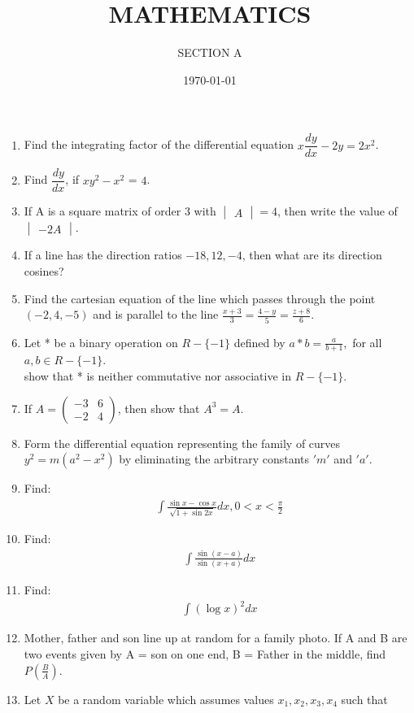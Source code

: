 \documentclass[10pt,-letter paper]{article}
\title{MATHEMATICS}
\author{SECTION A}
\date{\today}
\providecommand{\brak}[1]{\ensuremath{\left(#1\right)}}
\newcommand{\myvec}[1]{\ensuremath{\begin{pmatrix}#1\end{pmatrix}}}
\newcommand{\mydet}[1]{\ensuremath{\begin{vmatrix}#1\end{vmatrix}}}
\begin{document}
\maketitle

\begin{enumerate}
\item Find the integrating factor of the differential equation ${x}\dfrac{dy}{dx}-2{y}=2{x}^2$.
\item Find $\dfrac{dy}{dx}$, if ${x}{y}^2-{x}^2$ = $4$.
\item If A is a square matrix of order $3$ with $\mydet{A} = 4$, then write the value of $\mydet{-2A}$.
\item If a line has the direction ratios ${-18,12,-4}$, then what are its direction cosines?
\item Find the cartesian equation of the line which passes through the point $\brak{-2,4,-5}$ and is parallel to the line $\frac{{x} + {3}}{3}=\frac{{4} - {y}}{5}=\frac{{z} + {8}}{6}$.
\item Let * be a binary operation on $R-\{-1\}$ defined by $a * b = \frac{a}{{b} + {1}}$,~for all $a,b\in R-\{-1\}$. \\show that * is neither commutative nor associative in $R-\{-1\}$.
\item If $A=\myvec { -3 & 6 \\ -2 & 4}$, then show that ${A}^3=A$.
\item Form the differential equation representing the family of curves ${y}^2=m\brak{{a}^2-{x}^2}$ by eliminating the arbitrary constants $'m'$ and $'a'$.
\item Find: 
	\begin{align*}
		\int\frac{\sin{x} - \cos{x}}{\sqrt{1+\sin{2x}}}dx, 0<x<\frac{\pi}{2}
	\end{align*}
\item Find: 
	\begin{align*}
		\int\frac{\sin\brak{x-a}}{\sin\brak{x+a}}dx
	\end{align*}
\item Find:
	\begin{align*}
	\int\brak{\log{x}}^2dx
\end{align*}
\item Mother, father and son line up at random for a family photo. If A and B are two events given by A = son on one end, B = Father in the middle, find $P\brak{\frac{B}{A}}$.
\item Let ${X}$ be a random variable which assumes values ${x_1},{x_2},{x_3},{x_4}$ such that
	\begin{align*}

\end{align*}
\end{enumerate}
\end{document}
